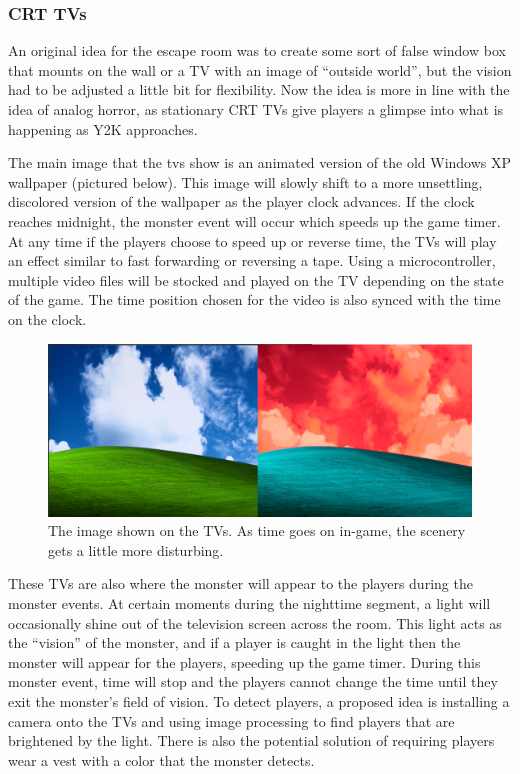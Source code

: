 \documentclass[conference]{IEEEtran}
\begin{document}
\subsubsection*{CRT TVs}
An original idea for the escape room was to create some sort of false window box that mounts on
the wall or a TV with an image of ``outside world'', but the vision had to be adjusted a little bit for flexibility.
Now the idea is more in line with the idea of analog horror, as stationary CRT TVs
give players a glimpse into what is happening as Y2K approaches.

The main image that the tvs show is an animated version of the old Windows XP wallpaper (pictured below).
This image will slowly shift to a more unsettling, discolored version of the wallpaper as the player clock advances. If the
clock reaches midnight, the monster event will occur which speeds up the game timer. At any time if the players
choose to speed up or reverse time, the TVs will play an effect similar to fast forwarding or reversing a tape.
Using a microcontroller, multiple video files will be stocked and played on the TV depending on the state of the
game. The time position chosen for the video is also synced with the time on the clock.
 
\begin{figure}[ht]
    \centering
    \includegraphics[width=0.90\columnwidth]{Images/tvcomparison.png}
    \caption{The image shown on the TVs. As time goes on in-game, the scenery
    gets a little more disturbing.}
\end{figure}

These TVs are also where the monster will appear to the players during the monster events. At certain moments
during the nighttime segment, a light will occasionally shine out of the television screen across the room. This light acts as
the ``vision'' of the monster, and if a player is caught in the light then the monster will appear for the players,
speeding up the game timer. During this monster event, time will stop and the players cannot change the
time until they exit the monster's field of vision. To detect players, a proposed idea is installing a camera
onto the TVs and using image processing to find players that are brightened by the light. There is also
the potential solution of requiring players wear a vest with a color that the monster detects.
\end{document}
